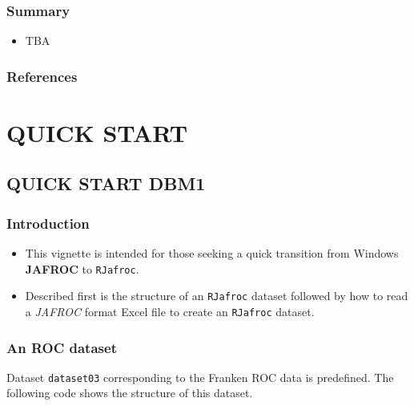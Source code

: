 \documentclass[]{book}
\providecommand{\tightlist}{%
  \setlength{\itemsep}{0pt}\setlength{\parskip}{0pt}}
\begin{document}
\hypertarget{summary-2}{%
\section{Summary}\label{summary-2}}

\begin{itemize}
\tightlist
\item
  TBA
\end{itemize}

\hypertarget{references-4}{%
\section{References}\label{references-4}}

\hypertarget{part-quick-start}{%
\part*{QUICK START}\label{part-quick-start}}

\hypertarget{QuickStartDBM1}{%
\chapter{QUICK START DBM1}\label{QuickStartDBM1}}

\hypertarget{introduction-4}{%
\section{Introduction}\label{introduction-4}}

\begin{itemize}
\tightlist
\item
  This vignette is intended for those seeking a quick transition from Windows \textbf{JAFROC} to \texttt{RJafroc}.
\item
  Described first is the structure of an \texttt{RJafroc} dataset followed by how to read
  a \emph{JAFROC} format Excel file to create an \texttt{RJafroc} dataset.
\end{itemize}

\hypertarget{an-roc-dataset}{%
\section{An ROC dataset}\label{an-roc-dataset}}

Dataset \texttt{dataset03} corresponding to the Franken ROC data \citep{RN1995} is predefined. The following code shows the structure of this dataset.
\end{document}

